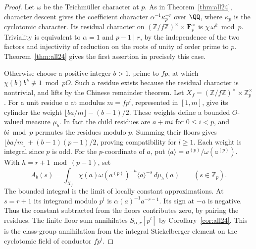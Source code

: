 \documentclass[a4paper,11pt]{article}
\theoremstyle{definition}
\theoremstyle{remark}
\newcommand{\ZZ}{\mathbb Z}\newcommand{\ord}{\operatorname{ord}}
\numberwithin{equation}{section}
\begin{document}
\begin{proof}
Let \(\omega\) be the Teichm\"uller character at \(p\). As in
Theorem~\ref{thm:all24}, character descent gives the coefficient
character \(\alpha^{-1}\kappa_p^{-r}\) over \(\QQ\), where
\(\kappa_p\) is the cyclotomic character. Its residual character
on \((\ZZ/f\ZZ)^\times\times\mathbf F_p^\times\) is
\(\chi\,\omega^k\bmod p\). Triviality is equivalent to
\(\alpha=1\) and \(p-1\mid r\), by the independence of the two
factors and injectivity of reduction on the roots of unity of
order prime to \(p\). Theorem~\ref{thm:all24} gives the first
assertion in precisely this case.

Otherwise choose a positive integer \(b>1\), prime to \(fp\), at
which \(\chi(b)b^k\not\equiv1\bmod pO\). Such a residue exists
because the residual character is nontrivial, and lifts by the
Chinese remainder theorem. Let \(X_f=(\ZZ/f\ZZ)^\times\times
\ZZ_p^\times\). For a unit residue \(a\) at modulus \(m=fp^l\),
represented in \([1,m]\), give its cylinder the weight
\(\lfloor ba/m\rfloor-(b-1)/2\). These weights define a bounded
\(O\)-valued measure \(\mu_b\). In fact the child residues are
\(a+mi\) for \(0\le i<p\), and \(bi\bmod p\) permutes the
residues modulo \(p\). Summing their floors gives
\(\lfloor ba/m\rfloor+(b-1)(p-1)/2\), proving compatibility
for \(l\ge1\). Each weight is integral since \(p\) is odd.
For the \(p\)-coordinate of \(a\), put
\(\langle a\rangle=a^{(p)}/\omega(a^{(p)})\).
With \(h=r+1\bmod(p-1)\), set
\[
 A_b(s)=\int_{X_f}\chi(a)\omega(a^{(p)})^{-h}
                            \langle a\rangle^{-s}\,d\mu_b(a)
                    \qquad(s\in\ZZ_p).
\]
The bounded integral is the limit of locally constant
approximations. At \(s=r+1\) its integrand modulo \(p^l\)
is \(\alpha(a)^{-1}a^{-r-1}\). Its sign at \(-a\) is negative.
Thus the constant subtracted from the floors contributes zero,
by pairing the residues. The finite floor sum annihilates
\(S_{\alpha,r}[p^l]\) by Corollary~\ref{cor:all24}. This is the
class-group annihilation from the integral Stickelberger element
on the cyclotomic field of conductor \(fp^l\).


\end{proof}
\end{document}
